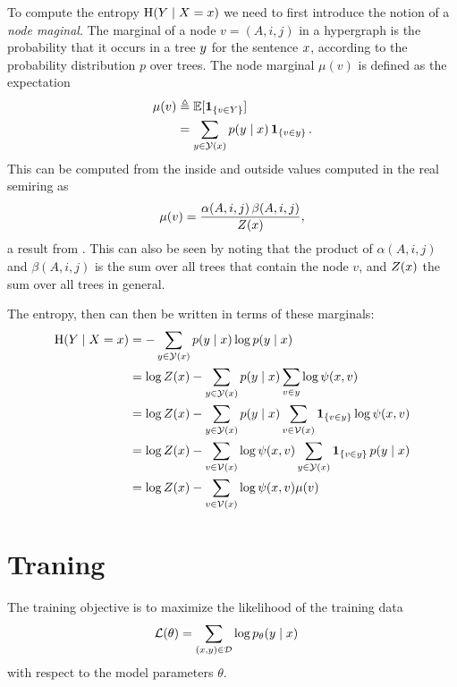       To compute the entropy $\operatorname{H}(Y \mid X = x)$ we need to first introduce the notion of a \textit{node maginal}. The marginal of a node $v = (A, i, j)$ in a hypergraph is the probability that it occurs in a tree $y$ for the sentence $x$, according to the probability distribution $p$ over trees. The node marginal $\mu(v)$ is defined as the expectation
      \begin{align}
        \label{eq:node-marginal}
        \mu(v)
          &\triangleq \operatorname{\mathbb{E}}[ \operatorname{\mathbf{1}}_{ \{ v \in Y \} } ]  \nonumber \\
          &= \sum_{ y \in \mathcal{Y}(x) } p(y \mid x) \operatorname{\mathbf{1}}_{ \{ v \in y \} }.
      \end{align}
      This can be computed from the inside and outside values computed in the real semiring as
      \begin{align}
        \mu(v) = \frac{\alpha(A, i, j) \, \beta(A, i, j)}{Z(x)},
      \end{align}
      a result from \citep{goodman1999semiring}. This can also be seen by noting that the product of $\alpha(A, i, j)$ and $\beta(A, i, j)$ is the sum over all trees that contain the node $v$, and $Z(x)$ the sum over all trees in general.

      The entropy, then can then be written in terms of these marginals:
      \begin{align}
        \label{eq:crf-entropy}
        \operatorname{H}(Y \mid X = x)
          &= - \sum_{ y \in \mathcal{Y}(x) } p(y \mid x) \log p(y \mid x)  \nonumber \\
          &= \log Z(x) - \sum_{ y \in \mathcal{Y}(x) } p(y \mid x) \sum_{v \in y} \log \psi(x, v)  \nonumber \\
          &= \log Z(x) - \sum_{ y \in \mathcal{Y}(x) } p(y \mid x) \sum_{ v \in \mathcal{V}(x) } \operatorname{\mathbf{1}}_{ \{ v \in y \} } \log \psi(x, v)  \nonumber \\
          &= \log Z(x) - \sum_{ v \in \mathcal{V}(x) } \log \psi(x, v)  \sum_{ y \in \mathcal{Y}(x) } \operatorname{\mathbf{1}}_{ \{ v \in y \} } p(y \mid x)  \nonumber \\
          &= \log Z(x) - \sum_{ v \in \mathcal{V}(x) } \log \psi(x, v) \mu(v)
      \end{align}

\section{Traning}
  The training objective is to maximize the likelihood of the training data
  \begin{align*}
    \mathcal{L}(\theta)
      &= \sum_{(x, y) \in \mathcal{D}} \log p_{\theta}(y \mid x)
  \end{align*}
  with respect to the model parameters $\theta$.

